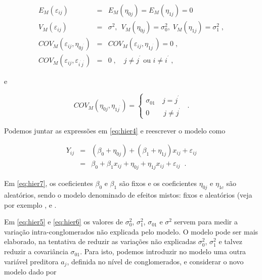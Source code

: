\documentclass[]{book}
\numberwithin{example}{chapter}
\numberwithin{remark}{chapter}
\numberwithin{definition}{chapter}
\begin{document}
\begin{eqnarray}
E_{M}\left( \varepsilon _{ij}\right) &=&E_{M}\left( \eta _{0j}\right)
=E_{M}\left( \eta _{1j}\right) =0  \label{eq:hier5} \\
V_{M}\left( \varepsilon _{ij}\right) &=&\sigma ^{2},\:\:V_{M}\left(
\eta _{0j}\right) =\sigma _{0}^{2},\;V_{M}\left( \eta _{1j}\right)
=\sigma _{1}^{2}\;,  \nonumber \\
COV_{M}\left( \varepsilon _{ij},\eta _{0j^{^{\prime }}}\right)
&=&COV_{M}\left( \varepsilon _{ij},\eta _{1j^{^{\prime }}}\right) =0\;, 
\nonumber \\
COV_{M}\left( \varepsilon _{ij},\varepsilon _{i^{^{\prime }}j^{^{\prime
}}}\right) &=&0\;,\quad j\neq j^{^{\prime }}\mbox{ ou }i\neq i^{^{\prime
}}\;,  \nonumber
\end{eqnarray}

e

\begin{equation}
COV_{M}\left( \eta _{0j},\eta _{1j^{^{\prime }}}\right) =\left\{ 
\begin{array}{l}
\sigma _{01}\quad j=j^{^{\prime }} \\ 
0\quad \quad j\neq j^{^{\prime }}
\end{array}
\right. \;\;.  \label{eq:hier6}
\end{equation}

Podemos juntar as expressões em \eqref{eq:hier4} e reescrever o modelo
como

\begin{eqnarray}
Y_{ij} &=&\left( \beta _{0}+\eta _{0j}\right) +\left( \beta _{1}+\eta
_{1j}\right) x_{ij}+\varepsilon _{ij}  \label{eq:hier7} \\
&=&\beta _{0}+\beta _{1}x_{ij}+\eta _{0j}+\eta _{1j}x_{ij}+\varepsilon
_{ij}\;\;.  \nonumber
\end{eqnarray}

Em \eqref{eq:hier7}, os coeficientes \(\beta _{0}\) e \(\beta _{1}\) são
fixos e os coeficientes \(\eta _{0j}\) e \(\eta _{1c}\) são aleatórios,
sendo o modelo denominado de efeitos mistos: fixos e aleatórios (veja
por exemplo \citep{Longford}, \citep{diggle} e \citep{bryk}.

Em \eqref{eq:hier5} e \eqref{eq:hier6} os valores de \(\sigma _{0}^{2}\),
\(\sigma _{1}^{2}\), \(\sigma _{01}\) e \(\sigma ^{2}\) servem para
medir a variação intra-conglomerados não explicada pelo modelo. O modelo
pode ser mais elaborado, na tentativa de reduzir as variações não
explicadas \(\sigma _{0}^{2}\), \(\sigma _{1}^{2}\) e talvez reduzir a
covariância \(\sigma _{01}\). Para isto, podemos introduzir no modelo
uma outra variável preditora \(a_{j}\), definida no nível de
conglomerados, e considerar o novo modelo dado por
\end{document}
